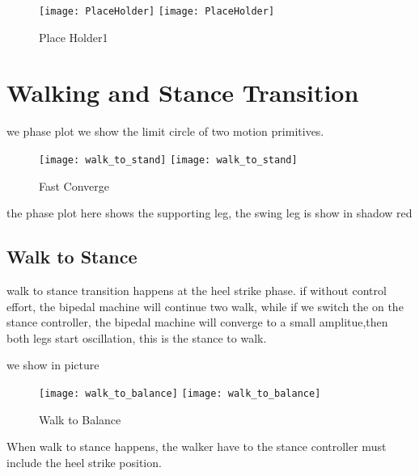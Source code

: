 \begin{figure}[!htbp]
  \begin{center}
    \leavevmode
    \ifpdf
      \texttt{[image: PlaceHolder]}
    \else
      \texttt{[image: PlaceHolder]}
    \fi
    \caption{Place Holder1}
    \label{fig:stancefall}
\end{center}
\end{figure}



\section{Walking and Stance Transition}
we phase plot we show the limit circle of two motion primitives.

\begin{figure}[!htbp]
  \begin{center}
    \leavevmode
    \ifpdf
      \texttt{[image: walk\_to\_stand]}
    \else
      \texttt{[image: walk\_to\_stand]}
    \fi
    \caption{Fast Converge}
    \label{fig:fastconverg}
\end{center}
\end{figure}

the phase plot here shows the supporting leg, the swing leg is show in shadow red


\subsection{Walk to Stance}
walk to stance transition happens at the heel strike phase.
if without control effort, the bipedal machine will continue two walk, while if we switch the on the stance controller,
the bipedal machine will converge to a small amplitue,then both legs start oscillation, this is the stance to walk.

we show in picture
\begin{figure}[!htbp]
  \begin{center}
    \leavevmode
    \ifpdf
      \texttt{[image: walk\_to\_balance]}
    \else
      \texttt{[image: walk\_to\_balance]}
    \fi
    \caption{Walk to Balance}
    \label{fig:walk to balance}
\end{center}
\end{figure}

When walk to stance happens, the walker have to the stance controller must include the heel strike position.


